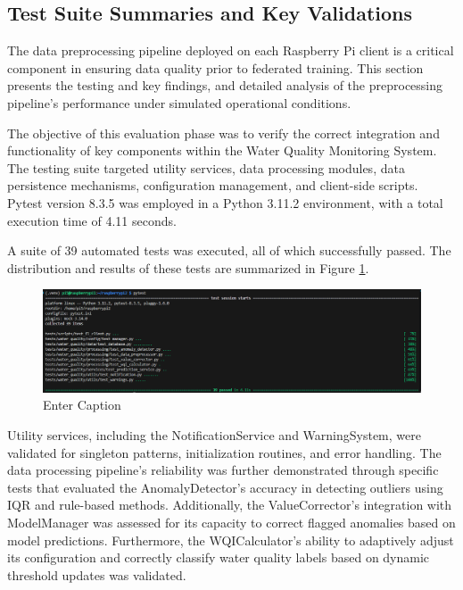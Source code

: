 \subsection{Test Suite Summaries and Key Validations}
The data preprocessing pipeline deployed on each Raspberry Pi client is a critical component in ensuring data quality prior to federated training. This section presents the testing and key findings, and detailed analysis of the preprocessing pipeline’s performance under simulated operational conditions.

The objective of this evaluation phase was to verify the correct integration and functionality of key components within the Water Quality Monitoring System. The testing suite targeted utility services, data processing modules, data persistence mechanisms, configuration management, and client-side scripts. Pytest version 8.3.5 was employed in a Python 3.11.2 environment, with a total execution time of 4.11 seconds.

A suite of 39 automated tests was executed, all of which successfully passed. The distribution and results of these tests are summarized in Figure \ref{fig:preprocessing-tests}.

\begin{figure}[h]
    \centering
    \includegraphics[width=1\linewidth]{Figures/preprecessing_tests.png}
    \caption{Enter Caption}
    \label{fig:preprocessing-tests}
\end{figure}

Utility services, including the NotificationService and WarningSystem, were validated for singleton patterns, initialization routines, and error handling. The data processing pipeline’s reliability was further demonstrated through specific tests that evaluated the AnomalyDetector’s accuracy in detecting outliers using IQR and rule-based methods. Additionally, the ValueCorrector’s integration with ModelManager was assessed for its capacity to correct flagged anomalies based on model predictions. Furthermore, the WQICalculator’s ability to adaptively adjust its configuration and correctly classify water quality labels based on dynamic threshold updates was validated.

